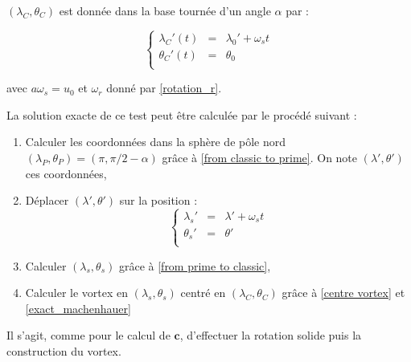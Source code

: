 $(\lambda_C, \theta_C)$ est donnée dans la base tournée d'un angle $\alpha$ par :

\begin{equation}
\label{centre vortex}
\left\lbrace
\begin{array}{rcl}
\lambda_C'(t) & = & \lambda_0' + \omega_s t\\
\theta_C'(t) & = & \theta_0 \\
\end{array}
\right.
\end{equation}

avec $a \omega_s = u_0$ et $\omega_r$ donné par \eqref{rotation_r}.

La solution exacte de ce test peut être calculée par le procédé suivant :

\begin{enumerate}
\item Calculer les coordonnées dans la sphère de pôle nord $(\lambda_P, \theta_P) = ( \pi, \pi/2 - \alpha)$ grâce à \eqref{from classic to prime}. On note $(\lambda', \theta')$ ces coordonnées,

\item Déplacer $(\lambda', \theta')$ sur la position :
\begin{equation}
\left\lbrace
\begin{array}{rcl}
\lambda_s' & = & \lambda' + \omega_s t\\
\theta_s' & = & \theta' \\
\end{array}
\right.
\end{equation}

\item Calculer $(\lambda_s, \theta_s)$ grâce à \eqref{from prime to classic},

\item Calculer le vortex en $(\lambda_s, \theta_s)$ centré en $(\lambda_C, \theta_C)$ grâce à \eqref{centre vortex} et \eqref{exact_machenhauer}
 
\end{enumerate}

Il s'agit, comme pour le calcul de $\mathbf{c}$, d'effectuer la rotation solide puis la construction du vortex.